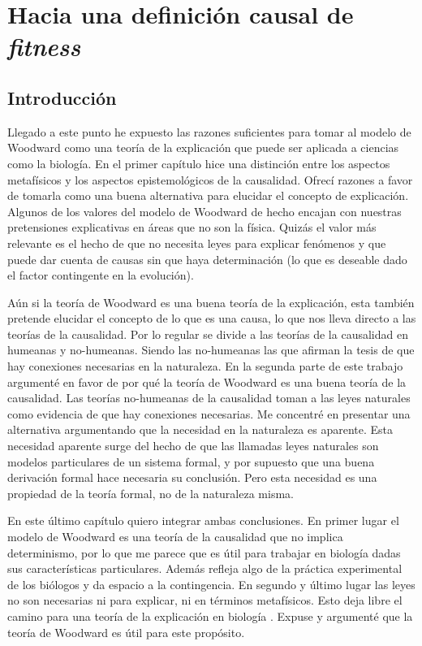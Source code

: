 \chapter{Hacia una definición causal de \emph{fitness}}

\section{Introducción}

\noindent Llegado a este punto he expuesto las razones suficientes para tomar al modelo de  Woodward como una teoría de la explicación que puede ser aplicada a ciencias como la biología. En el primer capítulo hice una distinción entre los aspectos metafísicos y los aspectos epistemológicos de la causalidad.  Ofrecí razones a  favor de tomarla como una buena alternativa para elucidar el concepto de explicación. Algunos de los valores del modelo de Woodward de hecho encajan con nuestras pretensiones explicativas en áreas que no son la física. Quizás el valor más relevante es el hecho de que no necesita leyes para explicar fenómenos y que puede dar cuenta de causas sin que haya determinación (lo que es deseable dado el factor contingente en la evolución).

Aún si la teoría de Woodward es una buena teoría de la explicación, esta también pretende elucidar el concepto de lo que es una causa, lo que nos lleva directo a las teorías de la causalidad. Por lo regular se divide a las teorías de la causalidad en humeanas y no-humeanas. Siendo las no-humeanas las que afirman la tesis de que hay conexiones necesarias en la naturaleza. En la segunda parte de este trabajo argumenté en favor de por qué la teoría de Woodward es una buena teoría de la causalidad. Las teorías no-humeanas de la causalidad toman a las leyes naturales como evidencia de que hay conexiones necesarias. Me concentré en presentar una alternativa argumentando que la necesidad en la naturaleza es aparente. Esta necesidad aparente surge del hecho de que las llamadas leyes naturales son modelos particulares de un sistema formal, y por supuesto que una buena derivación formal hace necesaria su conclusión. Pero esta necesidad es una propiedad de la teoría formal, no de la naturaleza misma.

En este último capítulo quiero integrar ambas conclusiones. En primer lugar el modelo de Woodward es una teoría de la causalidad que no implica determinismo, por lo que me parece que es útil para trabajar en biología dadas sus características particulares. Además refleja algo de la práctica experimental de los biólogos y da espacio a la contingencia. En segundo y último lugar las leyes no son necesarias ni para explicar, ni en términos metafísicos. Esto deja libre el camino para una teoría de la explicación en biología \cite{Brandon1997}. Expuse y argumenté que la teoría de Woodward es útil para este propósito.

